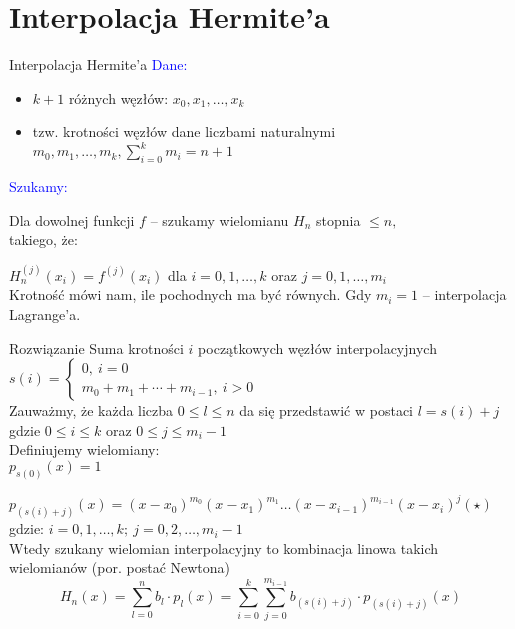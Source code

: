 \section{Interpolacja Hermite'a}


%
\begin{frame}{Interpolacja Hermite'a}
\textcolor{blue}{Dane:}
\begin{itemize}
\item $k+1$ różnych węzłów: $x_{0}, x_{1}, \dots, x_{k}$

\item tzw. krotności węzłów dane liczbami naturalnymi $m_{0}, m_{1},\dots , m_{k}, \displaystyle \sum_{i=0}^{k}m_{i}=n+1$
\end{itemize}
\textcolor{blue}{Szukamy:}

Dla dowolnej funkcji $f$ -- szukamy wielomianu $H_{n}$ stopnia $\leq n,$ \\
takiego, że:

$H_{n}^{(j)}(x_{i})=f^{(j)}(x_{i})$ \quad dla $i=0, 1, \dots , k$ oraz
$j=0, 1, \dots, m_{i}$\\
\vspace{0.5cm}
Krotność mówi nam, ile pochodnych ma być równych.
Gdy $m_{i}=1$ -- interpolacja Lagrange'a.
\end{frame}

\begin{frame}{Rozwiązanie}
Suma krotności $i$ początkowych węzłów interpolacyjnych
\vspace{2mm}
$s(i)=\left\{\begin{array}{l}
0,\ i=0\\
m_{0}+m_{1}+\cdots+m_{i-1},\ i>0
\end{array}\right.$
\vspace{2mm}\\

Zauważmy, że każda liczba 
$0\leq l\leq n$ da się przedstawić w postaci $l=s(i)+j$ gdzie $0 \leq i \leq k$ oraz $0 \leq j \leq m_{i}-1$\\
\vspace{0.5cm}
Definiujemy wielomiany:\\
$p_{s(0)}(x)=1$

$p_{(s(i)+j)}(x)=(x-x_{0})^{m_{0}}(x-x_{1})^{m_{1}}\ldots(x-x_{i-1})^{m_{i-1}}(x-x_{i})^{j}(\star)$ \\
gdzie: $i=0, 1, \dots, k; \: j=0, 2, \dots , m_{i}-1$ \\
Wtedy szukany wielomian interpolacyjny to kombinacja linowa takich wielomianów (por. postać Newtona)
$$
H_{n}(x)=\sum_{l=0}^{n}b_{l}\cdot p_{l}(x)=\sum_{i=0}^{k}\sum_{j=0}^{m_{i-1}}b_{(s(i)+j)}\cdot p_{(s(i)+j)}(x)
$$
\end{frame}

